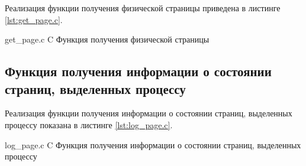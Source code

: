 Реализация функции получения физической страницы приведена в листинге \ref{lst:get_page.c}.

    {get_page.c}
    {C}
    {Функция получения физической страницы}
    
\subsection{Функция получения информации о состоянии страниц, выделенных процессу}

Реализация функции получения информации о состоянии страниц, выделенных процессу показана в листинге \ref{lst:log_page.c}.

    {log_page.c}
    {C}
    {Функция получения информации о состоянии страниц, выделенных процессу}